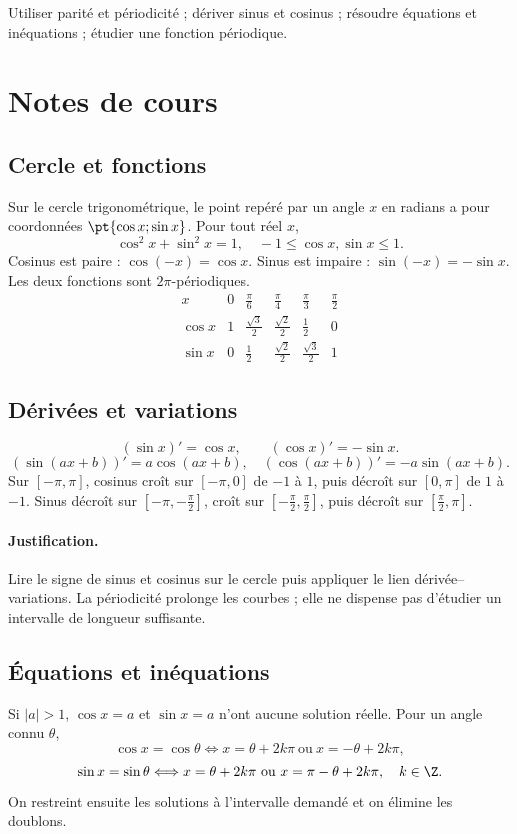\label{ch:5}


\begin{keypoint}[Objectifs]Utiliser parité et périodicité ; dériver sinus et cosinus ; résoudre équations et inéquations ; étudier une fonction périodique.\end{keypoint}

\section{Notes de cours}
\subsection{Cercle et fonctions}
Sur le cercle trigonométrique, le point repéré par un angle $x$ en radians a pour coordonnées $\pt{\cos x;\sin x}$. Pour tout réel $x$,
\[\cos^2x+\sin^2x=1,\quad -1\le\cos x,\sin x\le1.\]
Cosinus est paire : $\cos(-x)=\cos x$. Sinus est impaire : $\sin(-x)=-\sin x$. Les deux fonctions sont $2\pi$-périodiques.
\[\begin{array}{c|ccccc}x&0&\frac{\pi}{6}&\frac{\pi}{4}&\frac{\pi}{3}&\frac{\pi}{2}\\\hline
\cos x&1&\frac{\sqrt{3}}{2}&\frac{\sqrt{2}}{2}&\frac{1}{2}&0\\
\sin x&0&\frac{1}{2}&\frac{\sqrt{2}}{2}&\frac{\sqrt{3}}{2}&1
\end{array}\]
\subsection{Dérivées et variations}
\[(\sin x)'=\cos x,\qquad(\cos x)'=-\sin x.\]\[
(\sin(ax+b))'=a\cos(ax+b),\quad(\cos(ax+b))'=-a\sin(ax+b).\]
Sur $[-\pi,\pi]$, cosinus croît sur $[-\pi,0]$ de $-1$ à $1$, puis décroît sur $[0,\pi]$ de $1$ à $-1$. Sinus décroît sur $[-\pi,-\frac{\pi}{2}]$, croît sur $[-\frac{\pi}{2},\frac{\pi}{2}]$, puis décroît sur $[\frac{\pi}{2},\pi]$.
\paragraph{Justification.} Lire le signe de sinus et cosinus sur le cercle puis appliquer le lien dérivée--variations. La périodicité prolonge les courbes ; elle ne dispense pas d'étudier un intervalle de longueur suffisante.
\subsection{Équations et inéquations}
Si $|a|>1$, $\cos x=a$ et $\sin x=a$ n'ont aucune solution réelle. Pour un angle connu $\theta$,
\[\cos x=\cos\theta\Longleftrightarrow x=\theta+2k\pi\ \text{ou}\ x=-\theta+2k\pi,\]
\[\sin x=\sin\theta\Longleftrightarrow x=\theta+2k\pi\ \text{ou}\ x=\pi-\theta+2k\pi,\quad k\in\Z.\]
On restreint ensuite les solutions à l'intervalle demandé et on élimine les doublons.
